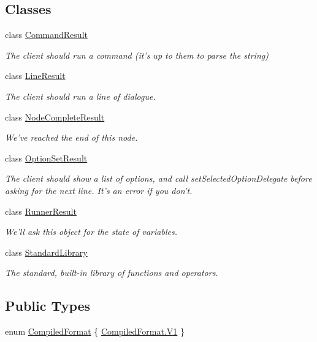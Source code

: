 \subsection*{Classes}
\begin{DoxyCompactItemize}
\item 
class \hyperlink{a00049}{Command\-Result}
\begin{DoxyCompactList}\small\item\em The client should run a command (it's up to them to parse the string) \end{DoxyCompactList}\item 
class \hyperlink{a00124}{Line\-Result}
\begin{DoxyCompactList}\small\item\em The client should run a line of dialogue. \end{DoxyCompactList}\item 
class \hyperlink{a00130}{Node\-Complete\-Result}
\begin{DoxyCompactList}\small\item\em We've reached the end of this node. \end{DoxyCompactList}\item 
class \hyperlink{a00134}{Option\-Set\-Result}
\begin{DoxyCompactList}\small\item\em The client should show a list of options, and call set\-Selected\-Option\-Delegate before asking for the next line. It's an error if you don't. \end{DoxyCompactList}\item 
class \hyperlink{a00141}{Runner\-Result}
\begin{DoxyCompactList}\small\item\em We'll ask this object for the state of variables. \end{DoxyCompactList}\item 
class \hyperlink{a00147}{Standard\-Library}
\begin{DoxyCompactList}\small\item\em The standard, built-\/in library of functions and operators. \end{DoxyCompactList}\end{DoxyCompactItemize}
\subsection*{Public Types}
\begin{DoxyCompactItemize}
\item 
enum \hyperlink{a00088_a903f18cdcc66c28ceab5a43c41fe074d}{Compiled\-Format} \{ \hyperlink{a00088_a903f18cdcc66c28ceab5a43c41fe074dab4daca084ad9eabfc8de231929477ed6}{Compiled\-Format.\-V1}
 \}
\end{DoxyCompactItemize}
